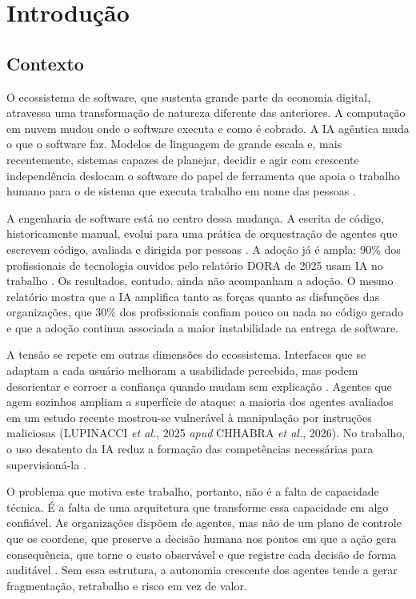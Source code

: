 
\chapter{Introdução}\label{cap:1}

\section{Contexto}\label{sec:1.1}

O ecossistema de software, que sustenta grande parte da economia digital, atravessa uma transformação de natureza diferente das anteriores. A computação em nuvem mudou onde o software executa e como é cobrado. A IA agêntica muda o que o software faz. Modelos de linguagem de grande escala e, mais recentemente, sistemas capazes de planejar, decidir e agir com crescente independência deslocam o software do papel de ferramenta que apoia o trabalho humano para o de sistema que executa trabalho em nome das pessoas \cite{vista2026outlook}.

A engenharia de software está no centro dessa mudança. A escrita de código, historicamente manual, evolui para uma prática de orquestração de agentes que escrevem código, avaliada e dirigida por pessoas \cite{anthropic2026trends}. A adoção já é ampla: 90\% dos profissionais de tecnologia ouvidos pelo relatório DORA de 2025 usam IA no trabalho \cite{dora2025}. Os resultados, contudo, ainda não acompanham a adoção. O mesmo relatório mostra que a IA amplifica tanto as forças quanto as disfunções das organizações, que 30\% dos profissionais confiam pouco ou nada no código gerado e que a adoção continua associada a maior instabilidade na entrega de software.

A tensão se repete em outras dimensões do ecossistema. Interfaces que se adaptam a cada usuário melhoram a usabilidade percebida, mas podem desorientar e corroer a confiança quando mudam sem explicação \cite{arora2025selfevolving}. Agentes que agem sozinhos ampliam a superfície de ataque: a maioria dos agentes avaliados em um estudo recente mostrou-se vulnerável à manipulação por instruções maliciosas (LUPINACCI \textit{et al.}, 2025 \textit{apud} CHHABRA \textit{et al.}, 2026)\nocite{chhabra2026security}. No trabalho, o uso desatento da IA reduz a formação das competências necessárias para supervisioná-la \cite{shen2026skill}.

O problema que motiva este trabalho, portanto, não é a falta de capacidade técnica. É a falta de uma arquitetura que transforme essa capacidade em algo confiável. As organizações dispõem de agentes, mas não de um plano de controle que os coordene, que preserve a decisão humana nos pontos em que a ação gera consequência, que torne o custo observável e que registre cada decisão de forma auditável \cite{isg2025agentic,spark2026cio}. Sem essa estrutura, a autonomia crescente dos agentes tende a gerar fragmentação, retrabalho e risco em vez de valor.

